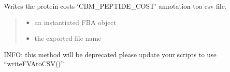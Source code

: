 \documentclass[letterpaper,12pt,english]{sphinxmanual}
\begin{document}
\begin{fulllineitems}

\pysigstartsignatures
\pysiglinewithargsret
{}
{\sphinxparamcomma {}}
{}
\pysigstopsignatures
\sphinxAtStartPar
Writes the protein costs ‘CBM\_PEPTIDE\_COST’ annotation toa csv file.
\begin{quote}\begin{description}
\begin{itemize}
\item {} 
\sphinxAtStartPar
{} \textendash{} an instantiated FBA object

\item {} 
\sphinxAtStartPar
{} \textendash{} the exported file name

\end{itemize}

\end{description}\end{quote}

\end{fulllineitems}



\begin{fulllineitems}

\pysigstartsignatures
\pysiglinewithargsret
{}
{\sphinxparamcomma {}\sphinxparamcomma {}\sphinxparamcomma {}\sphinxparamcomma {}}
{}
\pysigstopsignatures
\sphinxAtStartPar
INFO: this method will be deprecated please update your scripts to use “writeFVAtoCSV()”

\end{fulllineitems}
\end{document}
